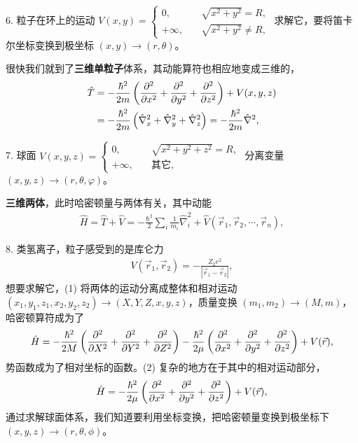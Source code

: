 6. 粒子在环上的运动 $V(x,y) = \begin{cases}
    0, \quad &\sqrt{x^2 + y^2} = R, \\
    +\infty, \quad &\sqrt{x^2+y^2} \neq R,
\end{cases}$
求解它，要将笛卡尔坐标变换到极坐标 $(x,y) \rightarrow (r,\theta)$。

很快我们就到了\textbf{三维单粒子}体系，其动能算符也相应地变成三维的，
\begin{align}
    \hat T &= -\frac{\hbar^2}{2m} \left(\pdv[2]x + \pdv[2]y + \pdv[2]z\right) + V(x,y,z) \\
    &= -\frac{\hbar^2}{2m} \left(
        \hat\nabla_x^2 + \hat\nabla_y^2 + \hat\nabla_z^2 
    \right) = -\frac{\hbar^2}{2m} \hat\nabla^2, 
\end{align}

7. 球面 $V(x,y,z) = \begin{cases}
    0, \quad &\sqrt{x^2 + y^2 + z^2} = R, \\
    +\infty, \quad&\text{其它},
\end{cases}$
分离变量 $(x,y,z) \rightarrow (r,\theta,\varphi)$。

\textbf{三维两体}，此时哈密顿量与两体有关，其中动能
\begin{align}
    \hat H = \hat T + \hat V = -\frac{\hbar^2}2 \sum_i \frac{1}{m_i} \hat\nabla_i^2 + \hat V(\vec r_1, \vec r_2, \cdots, \vec r_n),
\end{align}

8. 类氢离子，粒子感受到的是库仑力
\begin{align}
    V(\vec r_1, \vec r_2) = - \frac{Z_2 e^2}{|\vec r_1 - \vec r_2|},
\end{align}
想要求解它，(1) 将两体的运动分离成整体和相对运动 $(x_1, y_1, z_1, x_2, y_2, z_2) \rightarrow (X,Y,Z, x,y,z)$，质量变换 $(m_1, m_2) \rightarrow (M, m)$，哈密顿算符成为了
\begin{align}
    \hat H = - \frac{\hbar^2}{2M} \left(
        \pdv[2]X + \pdv[2]Y + \pdv[2]Z
    \right) - \frac{\hbar^2}{2\mu}  \left(
        \pdv[2]x + \pdv[2]y + \pdv[2]z
    \right) + V(\vec r), 
\end{align}
势函数成为了相对坐标的函数。(2) 复杂的地方在于其中的相对运动部分，
\begin{align}
    \hat H = -\frac{\hbar^2}{2\mu}  \left(
        \pdv[2]x + \pdv[2]y + \pdv[2]z
    \right) + V(\vec r), 
\end{align}
通过求解球面体系，我们知道要利用坐标变换，把哈密顿量变换到极坐标下 $(x,y,z) \rightarrow (r,\theta,\phi)$。

